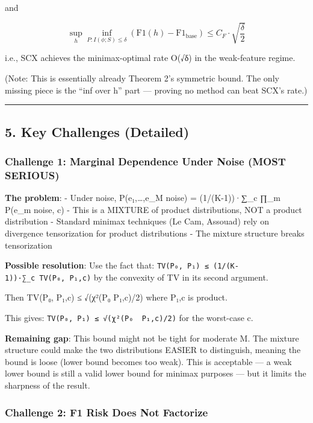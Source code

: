 \documentclass[
  12pt,
]{article}
\begin{document}
and

\[\sup_{h} \inf_{P: I(\phi;S) \leq \delta} \left(\text{F1}(h) - \text{F1}_{\text{base}}\right) \leq C_F \cdot \sqrt{\frac{\delta}{2}}\]

i.e., SCX achieves the minimax-optimal rate O(√δ) in the weak-feature
regime.

(Note: This is essentially already Theorem 2's symmetric bound. The only
missing piece is the ``inf over h'' part --- proving no method can beat
SCX's rate.)

\begin{center}\rule{0.5\linewidth}{0.5pt}\end{center}

\subsection{5. Key Challenges (Detailed)}\label{key-challenges-detailed}

\subsubsection{Challenge 1: Marginal Dependence Under Noise (MOST
SERIOUS)}\label{challenge-1-marginal-dependence-under-noise-most-serious}

\textbf{The problem}: - Under noise, P(e₁,\ldots,e\_M \textbar{} noise)
= (1/(K-1))·∑\_c ∏\_m P(e\_m \textbar{} noise, c) - This is a MIXTURE of
product distributions, NOT a product distribution - Standard minimax
techniques (Le Cam, Assouad) rely on divergence tensorization for
product distributions - The mixture structure breaks tensorization

\textbf{Possible resolution}: Use the fact that:
\texttt{TV(P₀,\ P₁)\ ≤\ (1/(K-1))·∑\_c\ TV(P₀,\ P₁,c)} by the convexity
of TV in its second argument.

Then TV(P₀, P₁,c) ≤ √(χ²(P₀ \textbar\textbar{} P₁,c)/2) where P₁,c is
product.

This gives:
\texttt{TV(P₀,\ P₁)\ ≤\ √(χ²(P₀\ \textbar{}\textbar{}\ P₁,c)/2)} for the
worst-case c.

\textbf{Remaining gap}: This bound might not be tight for moderate M.
The mixture structure could make the two distributions EASIER to
distinguish, meaning the bound is loose (lower bound becomes too weak).
This is acceptable --- a weak lower bound is still a valid lower bound
for minimax purposes --- but it limits the sharpness of the result.

\subsubsection{Challenge 2: F1 Risk Does Not
Factorize}\label{challenge-2-f1-risk-does-not-factorize}
\end{document}
